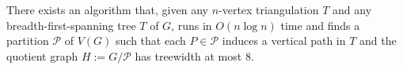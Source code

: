 \documentclass[kpfonts]{patmorin}
\let\ge\geqslant
\begin{document}
\begin{thm}
  There exists an algorithm that, given any $n$-vertex triangulation $T$ and any breadth-first-spanning tree $T$ of $G$, runs in $O(n\log n)$ time and finds a partition $\mathcal{P}$ of $V(G)$ such that each $P\in\mathcal{P}$ induces a vertical path in $T$ and the quotient graph $H:=G/\mathcal{P}$ has treewidth at most $8$.
\end{thm}

%
%
%
%
%
%
%
\end{document}
